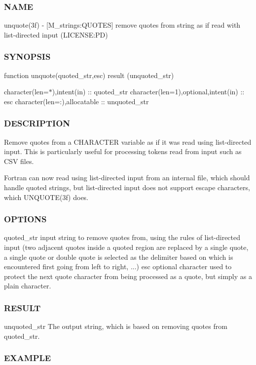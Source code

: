 \subsubsection*{N\+A\+ME}

unquote(3f) -\/ \mbox{[}M\+\_\+strings\+:Q\+U\+O\+T\+ES\mbox{]} remove quotes from string as if read with list-\/directed input (L\+I\+C\+E\+N\+SE\+:PD) \subsubsection*{S\+Y\+N\+O\+P\+S\+IS}

function unquote(quoted\+\_\+str,esc) result (unquoted\+\_\+str)

character(len=$\ast$),intent(in) \+:\+: quoted\+\_\+str character(len=1),optional,intent(in) \+:\+: esc character(len=\+:),allocatable \+:\+: unquoted\+\_\+str \subsubsection*{D\+E\+S\+C\+R\+I\+P\+T\+I\+ON}

Remove quotes from a C\+H\+A\+R\+A\+C\+T\+ER variable as if it was read using list-\/directed input. This is particularly useful for processing tokens read from input such as C\+SV files.

Fortran can now read using list-\/directed input from an internal file, which should handle quoted strings, but list-\/directed input does not support escape characters, which U\+N\+Q\+U\+O\+T\+E(3f) does. \subsubsection*{O\+P\+T\+I\+O\+NS}

quoted\+\_\+str input string to remove quotes from, using the rules of list-\/directed input (two adjacent quotes inside a quoted region are replaced by a single quote, a single quote or double quote is selected as the delimiter based on which is encountered first going from left to right, ...) esc optional character used to protect the next quote character from being processed as a quote, but simply as a plain character. \subsubsection*{R\+E\+S\+U\+LT}

unquoted\+\_\+str The output string, which is based on removing quotes from quoted\+\_\+str. \subsubsection*{E\+X\+A\+M\+P\+LE}

